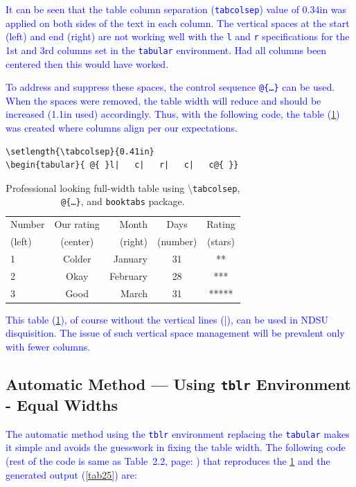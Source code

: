 \documentclass[phd]{ndsu-thesis-2022}
\newcommand\italk[1]{\textcolor{blue}{#1}}  %
\newcommand\cmd[1]{\textbackslash\texttt{#1}}  %
\newcommand\vb[1]{\textcolor{blue}{\texttt{#1}}}%
\begin{document}
\italk{It can be seen that the table column separation (\vb{tabcolsep}) value of 0.34in was applied on both sides of the text in each column. The vertical spaces at the start (left) and end (right) are not working well with the \vb{l} and \vb{r} specifications for the 1st and 3rd columns set in the \vb{tabular} environment. Had all columns been centered then this would have worked.}

\italk{To address and suppress these spaces, the control sequence \vb{@\{\ldots\}} can be used. When the spaces were removed, the table width will reduce and should be increased (1.1in used) accordingly. Thus, with the following code, the table (\cref{tab24}) was created where columns align per our expectations.
}

{\singlespacing
\begin{verbatim}
\setlength{\tabcolsep}{0.41in}
\begin{tabular}{ @{ }l|   c|   r|   c|   c@{ }}
\end{verbatim}
}

\begin{table}[ht!]
\centering
\caption{Professional looking full-width table using \cmd{tabcolsep}, \texttt{@\{\ldots\}}, and \texttt{booktabs} package.}
\setlength{\tabcolsep}{0.41in}
\begin{tabular}{ @{ }l|   c|   r|   c|   c@{ }}
\toprule
Number & Our rating & Month & Days & Rating\\
(left) & (center)   & (right) & (number) & (stars)\\
\midrule
1 & Colder & January & 31 & **\\
2 & Okay   & February & 28 & ***\\
3 & Good   & March & 31 & *****\\
\bottomrule
\end{tabular}
\label{tab24}
\end{table}

\italk{This table (\cref{tab24}), of course without the vertical lines (|), can be used in NDSU disquisition. The issue of such vertical space management will be prevalent only with fewer columns.}

\subsection{Automatic Method --- Using \texttt{tblr} Environment - Equal Widths}
\italk{The automatic method using the \vb{tblr} environment replacing the \vb{tabular} makes it simple and avoids the guesswork in fixing the table width. The following code (rest of the code is same as Table~2.2, page: \pageref{tabcode22}) that reproduces the \cref{tab24} and the generated output (\cref{tab25}) are:} 
\end{document}
